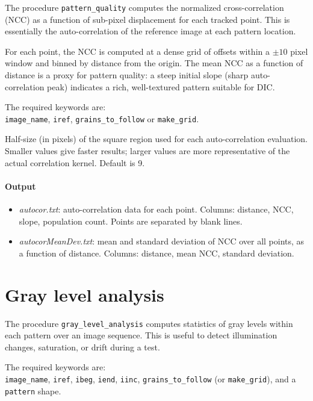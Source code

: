 \documentclass{simpledoc}
\newcommand{\var}[1]{{\color{myblue}$\langle$#1$\rangle$}}
\newcommand{\file}[1]{\textit{\color{myblue}#1}}
\newcommand{\scr}[1]{\texttt{\color{myblue}#1}}
\begin{document}
The procedure \scr{pattern\_quality} computes the normalized cross-correlation (NCC) as a
function of sub-pixel displacement for each tracked point.
This is essentially the auto-correlation of the reference image at each pattern location.

For each point, the NCC is computed at a dense grid of offsets within a $\pm 10$ pixel window
and binned by distance from the origin.
The mean NCC as a function of distance is a proxy for pattern quality: a steep initial slope
(sharp auto-correlation peak) indicates a rich, well-textured pattern suitable for DIC.

The required keywords are:\\
\scr{image\_name}, \scr{iref}, \scr{grains\_to\_follow} or \scr{make\_grid}.

\marginlabel{\scr{halfPatternQual} \var{n}}
Half-size (in pixels) of the square region used for each auto-correlation evaluation.
Smaller values give faster results; larger values are more representative of the actual
correlation kernel. Default is 9.

\paragraph{Output}
\begin{itemize}
  \item \file{autocor.txt}: auto-correlation data for each point.
    Columns: distance, NCC, slope, population count.
    Points are separated by blank lines.
  \item \file{autocorMeanDev.txt}: mean and standard deviation of NCC over all points,
    as a function of distance. Columns: distance, mean NCC, standard deviation.
\end{itemize}

\section{Gray level analysis}
\label{sec:grayanalysis}

The procedure \scr{gray\_level\_analysis} computes statistics of gray levels within each pattern
over an image sequence.
This is useful to detect illumination changes, saturation, or drift during a test.

The required keywords are:\\
\scr{image\_name}, \scr{iref}, \scr{ibeg}, \scr{iend}, \scr{iinc},
\scr{grains\_to\_follow} (or \scr{make\_grid}), and a \scr{pattern} shape.
\end{document}
